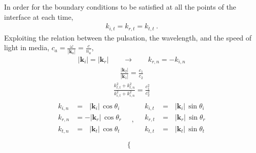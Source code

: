 \documentclass[letterpaper,10pt,english]{jupyterBook}
\begin{document}
\sphinxAtStartPar
In order for the boundary conditions to be satisfied at all the points of the interface at each time,
\begin{equation*}
\begin{split}k_{i,t} = k_{r,t} = k_{t,t} \ .\end{split}
\end{equation*}
\sphinxAtStartPar
Exploiting the relation between the pulsation, the wave\sphinxhyphen{}length, and the speed of light in media, \(c_a = \frac{\omega}{|\mathbf{k}_a|} = \frac{c}{n_a}\),
\begin{equation*}
\begin{split}|\mathbf{k}_i| = |\mathbf{k}_r| \qquad \rightarrow \qquad k_{r,n} = - k_{i,n}\end{split}
\end{equation*}\begin{equation*}
\begin{split}\frac{|\mathbf{k}_2|}{|\mathbf{k}_1|} = \frac{c_1}{c_2}\end{split}
\end{equation*}\begin{equation*}
\begin{split}\frac{k_{t,t}^2 + k_{t,n}^2}{k_{i,t}^2 + k_{i,n}^2} = \frac{c_1^2}{c_2^2}\end{split}
\end{equation*}\begin{equation*}
\begin{split}
\begin{aligned}
  k_{i,n} & = \ \ \ |\mathbf{k}_i| \, \cos \theta_i \\
  k_{r,n} & = -     |\mathbf{k}_r| \, \cos \theta_r \\
  k_{t,n} & = \ \ \ |\mathbf{k}_t| \, \cos \theta_t \\
\end{aligned}
\quad , \quad
\begin{aligned}
  k_{i,t} & = \ \ \ |\mathbf{k}_i| \, \sin \theta_i \\
  k_{r,t} & = \ \ \ |\mathbf{k}_r| \, \sin \theta_r \\
  k_{t,t} & = \ \ \ |\mathbf{k}_t| \, \sin \theta_t \\
\end{aligned}
\end{split}
\end{equation*}\begin{equation*}
\begin{split}\begin{cases}

\end{cases}
\end{split}
\end{equation*}
\end{document}
